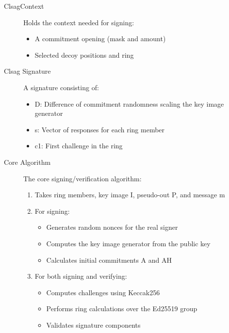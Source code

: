 \begin{description}
\item[ClsagContext] \hfill  %

Holds the context needed for signing:
\begin{itemize}
\item A commitment opening (mask and amount)
\item Selected decoy positions and ring
\end{itemize}

\item[Clsag Signature] \hfill %

A signature consisting of:
\begin{itemize}
\item D: Difference of commitment randomness scaling the key image generator
\item s: Vector of responses for each ring member
\item c1: First challenge in the ring
\end{itemize}

\item[Core Algorithm] \hfill  %

The core signing/verification algorithm:
\begin{enumerate}
\item Takes ring members, key image I, pseudo-out P, and message m
\item For signing:
  \begin{itemize}
  \item Generates random nonces for the real signer
  \item Computes the key image generator from the public key
  \item Calculates initial commitments A and AH
  \end{itemize}
\item For both signing and verifying:
  \begin{itemize}
  \item Computes challenges using Keccak256
  \item Performs ring calculations over the Ed25519 group
  \item Validates signature components
  \end{itemize}
\end{enumerate}
\end{description}

